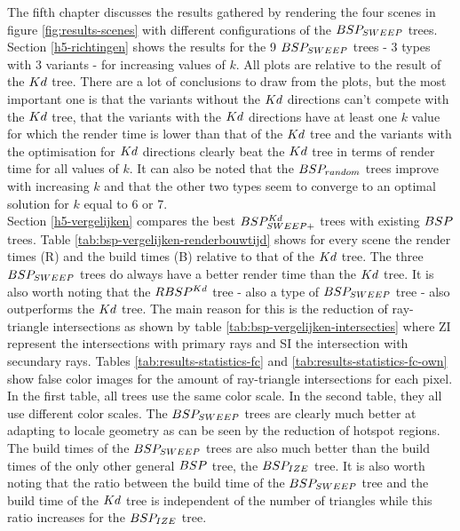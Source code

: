 The fifth chapter discusses the results gathered by rendering the four scenes in figure \ref{fig:results-scenes} with different configurations of the $BSP_{SWEEP}$ trees.
Section \ref{h5-richtingen} shows the results for the 9 $BSP_{SWEEP}$ trees - 3 types with 3 variants - for increasing values of $k$.
All plots are relative to the result of the $Kd$ tree.
There are a lot of conclusions to draw from the plots, but the most important one is that the variants without the $Kd$ directions can't compete with the $Kd$ tree, that the variants with the $Kd$ directions have at least one $k$ value for which the render time is lower than that of the $Kd$ tree and the variants with the optimisation for $Kd$ directions clearly beat the $Kd$ tree in terms of render time for all values of $k$.
It can also be noted that the $BSP_{random}$ trees improve with increasing $k$ and that the other two types seem to converge to an optimal solution for $k$ equal to 6 or 7.\\

Section \ref{h5-vergelijken} compares the best $BSP^{Kd}_{SWEEP+}$ trees with existing $BSP$ trees.
Table \ref{tab:bsp-vergelijken-renderbouwtijd} shows for every scene the render times (R) and the build times (B) relative to that of the $Kd$ tree.
The three $BSP_{SWEEP}$ trees do always have a better render time than the $Kd$ tree.
It is also worth noting that the $RBSP^{Kd}$ tree - also a type of $BSP_{SWEEP}$ tree - also outperforms the $Kd$ tree.
 The main reason for this is the reduction of ray-triangle intersections as shown by table \ref{tab:bsp-vergelijken-intersecties} where ZI represent the intersections with primary rays and SI the intersection with secundary rays.
Tables \ref{tab:results-statistics-fc} and \ref{tab:results-statistics-fc-own} show false color images for the amount of ray-triangle intersections for each pixel. In the first table, all trees use the same color scale. In the second table, they all use different color scales. 
The $BSP_{SWEEP}$ trees are clearly much better at adapting to locale geometry as can be seen by the reduction of hotspot regions.
The build times of the $BSP_{SWEEP}$ trees are also much better than the build times of the only other general $BSP$ tree, the $BSP_{IZE}$ tree. 
It is also worth noting that the ratio between the build time of the $BSP_{SWEEP}$ tree and the build time of the $Kd$ tree is independent of the number of triangles while this ratio increases for the $BSP_{IZE}$ tree.
\\

